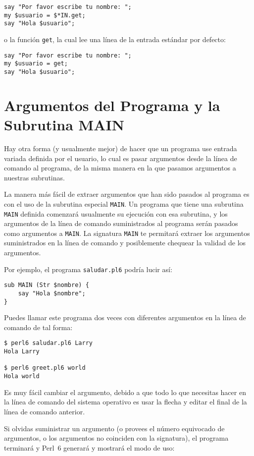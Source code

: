 \begin{verbatim}
say "Por favor escribe tu nombre: ";
my $usuario = $*IN.get;
say "Hola $usuario";
\end{verbatim}
%
o la función {\tt get}, la cual lee una línea de la entrada
estándar por defecto:
\begin{verbatim}
say "Por favor escribe tu nombre: ";
my $usuario = get;
say "Hola $usuario";
\end{verbatim}
%

\section{Argumentos del Programa y la Subrutina MAIN}
\label{MAIN}

Hay otra forma (y usualmente mejor) de hacer que un programa
use entrada variada definida por el usuario, lo cual es 
pasar argumentos desde la línea de comando al programa, de 
la misma manera en la que pasamos argumentos a nuestras subrutinas.

La manera más fácil de extraer argumentos que han sido pasados
al programa es con el uso de la subrutina especial \verb|MAIN|.
Un programa que tiene una subrutina \verb|MAIN| definida
comenzará usualmente su ejecución con esa subrutina, y los argumentos
de la línea de comando suministrados al programa serán pasados
como argumentos a \verb|MAIN|. La signatura \verb|MAIN| te 
permitará extraer los argumentos suministrados en la línea de comando
y posiblemente chequear la validad de los argumentos. 

Por ejemplo, el programa {\tt saludar.pl6} podría lucir
así:
\begin{verbatim}
sub MAIN (Str $nombre) {
    say "Hola $nombre";
}
\end{verbatim}

Puedes llamar este programa dos veces con diferentes argumentos
en la línea de comando de tal forma:

\begin{verbatim}
$ perl6 saludar.pl6 Larry
Hola Larry

$ perl6 greet.pl6 world
Hola world
\end{verbatim}

Es muy fácil cambiar el argumento, debido a que todo lo que
necesitas hacer en la línea de comando del sistema operativo
es usar la flecha y editar el final de la línea de comando
anterior.

Si olvidas suministrar un argumento (o provees el número 
equivocado de argumentos, o los argumentos no coinciden con
la signatura), el programa terminará y Perl~6 generará
y mostrará el modo de uso:

